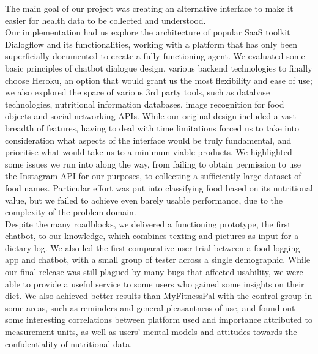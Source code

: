 The main goal of our project was creating an alternative interface to make it easier for health data to be collected and understood. \\
Our implementation had us explore the architecture of popular SaaS toolkit Dialogflow and its functionalities, working with a platform that has only been superficially documented to create a fully functioning agent. We evaluated some basic principles of chatbot dialogue design, various backend technologies to finally choose Heroku, an option that would grant us the most flexibility and ease of use; we also explored the space of various 3rd party tools, such as database technologies, nutritional information databases, image recognition for food objects and social networking APIs. While our original design included a vast breadth of features, having to deal with time limitations forced us to take into consideration what aspects of the interface would be truly fundamental, and prioritise what would take us to a minimum viable products. We highlighted some issues we run into along the way, from failing to obtain permission to use the Instagram API for our purposes, to collecting a sufficiently large dataset of food names. Particular effort was put into classifying food based on its nutritional value, but we failed to achieve even barely usable performance, due to the complexity of the problem domain.\\
Despite the many roadblocks, we delivered a functioning prototype, the first chatbot, to our knowledge, which combines texting and pictures as input for a dietary log. We also led the first comparative user trial between a food logging app and chatbot, with a small group of tester across a single demographic. While our final release was still plagued by many bugs that affected usability, we were able to provide a useful service to some users who gained some insights on their diet. We also achieved better results than MyFitnessPal with the control group in some areas, such as reminders and general pleasantness of use, and found out some interesting correlations between platform used and importance attributed to measurement units, as well as users' mental models and attitudes towards the confidentiality of nutritional data. \\
